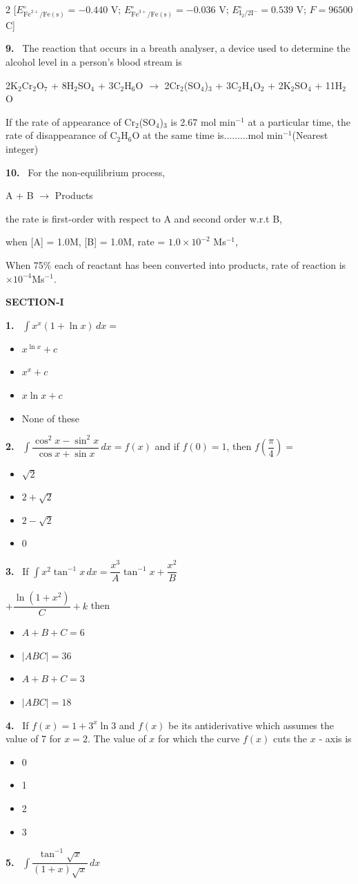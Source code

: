 \documentclass[10pt]{extarticle}
\newcommand{\partsec}[2]{\par\medskip\noindent{\large\bfseries PART-#1: #2}\par\smallskip}
\newcommand{\sect}[1]{\par\smallskip\noindent\textbf{#1}\par}
\newcommand{\qn}[1]{\par\smallskip\noindent\textbf{#1.}~}
\newenvironment{qoptions}{\begin{itemize}[leftmargin=1.8em,itemsep=1pt,topsep=2pt,label={}]}{\end{itemize}}
\newcommand{\opt}[2]{\item[(#1)] #2}
\begin{document}
\begin{multicols}{2}
[$E^\circ_{\mathrm{Fe}^{2+}/\mathrm{Fe(s)}}=-0.440$ V; $E^\circ_{\mathrm{Fe}^{3+}/\mathrm{Fe(s)}}=-0.036$ V; $E^\circ_{\mathrm{I}_2/2\mathrm{I}^-}=0.539$ V; $F=96500$ C]
\qn{9} The reaction that occurs in a breath analyser, a device used to determine the alcohol level in a person's blood stream is\par
2K$_2$Cr$_2$O$_7$ + 8H$_2$SO$_4$ + 3C$_2$H$_6$O $\to$ 2Cr$_2$(SO$_4$)$_3$ + 3C$_2$H$_4$O$_2$ + 2K$_2$SO$_4$ + 11H$_2$O\par
If the rate of appearance of Cr$_2$(SO$_4$)$_3$ is 2.67 mol min$^{-1}$ at a particular time, the rate of disappearance of C$_2$H$_6$O at the same time is.........mol min$^{-1}$(Nearest integer)
\qn{10} For the non-equilibrium process,\par
A + B $\to$ Products\par
the rate is first-order with respect to A and second order w.r.t B,\par
when [A] = 1.0M, [B] = 1.0M, rate = $1.0\times10^{-2}$ Ms$^{-1}$,\par
When 75\% each of reactant has been converted into products, rate of reaction is \underline{\hspace{0.8cm}}$\times10^{-4}$Ms$^{-1}$.
\partsec{3}{MATHEMATICS}
\sect{SECTION-I}
\qn{1} $\displaystyle\int x^x(1+\ln x)\,dx=$
\begin{qoptions}
\opt{A}{$x^{\ln x}+c$}
\opt{B}{$x^x+c$}
\opt{C}{$x\ln x+c$}
\opt{D}{None of these}
\end{qoptions}
\qn{2} $\displaystyle\int\dfrac{\cos^2x-\sin^2x}{\cos x+\sin x}\,dx=f(x)$ and if $f(0)=1$, then $f\!\left(\dfrac\pi4\right)=$
\begin{qoptions}
\opt{A}{$\sqrt2$}
\opt{B}{$2+\sqrt2$}
\opt{C}{$2-\sqrt2$}
\opt{D}{0}
\end{qoptions}
\qn{3} If $\displaystyle\int x^2\tan^{-1}x\,dx=\dfrac{x^3}{A}\tan^{-1}x+\dfrac{x^2}{B}$\par
$+\dfrac{\ln(1+x^2)}{C}+k$ then
\begin{qoptions}
\opt{A}{$A+B+C=6$}
\opt{B}{$|ABC|=36$}
\opt{C}{$A+B+C=3$}
\opt{D}{$|ABC|=18$}
\end{qoptions}
\qn{4} If $f(x)=1+3^x\ln3$ and $f(x)$ be its antiderivative which assumes the value of 7 for $x=2$. The value of $x$ for which the curve $f(x)$ cuts the $x$ - axis is
\begin{qoptions}
\opt{A}{0}
\opt{B}{1}
\opt{C}{2}
\opt{D}{3}
\end{qoptions}
\qn{5} $\displaystyle\int\dfrac{\tan^{-1}\sqrt x}{(1+x)\sqrt x}\,dx$
\begin{qoptions}

\end{qoptions}
\end{multicols}
\end{document}
